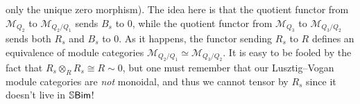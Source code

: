 \begin{example}
only the unique zero morphism). The idea here is that the quotient functor from $\mathcal{M}_{Q_2}$ to $\mathcal{M}_{Q_2/Q_1}$ sends $B_s$ to $0$, while the quotient functor from $\mathcal{M}_{Q_3}$ to $\mathcal{M}_{Q_3/Q_2}$ sends both $R_s$ and $B_s$ to $0$. As it happens, the functor sending $R_s$ to $R$ defines an equivalence of module categories $\mathcal{M}_{Q_2/Q_1} \simeq \mathcal{M}_{Q_3/Q_2}$. It is easy to be fooled by the fact that $R_s \otimes_R R_s \cong R \sim 0$, but one must remember that our Lusztig--Vogan module categories are {\em not} monoidal, and thus we cannot tensor by $R_s$ since it doesn't live in $\mathbb{S}\textup{\textsf{Bim}}$!\\ %

\end{example}

